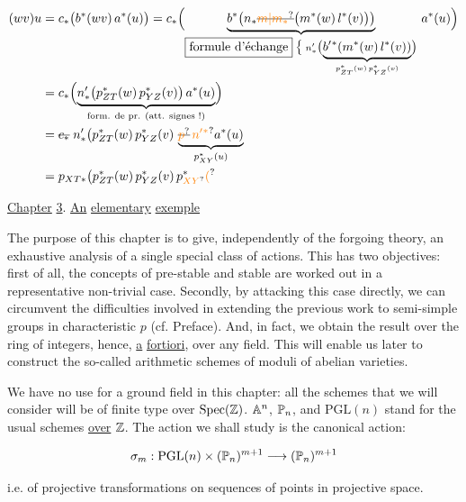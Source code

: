 \[
\begin{aligned}
(wv)u&=c_*\bigl(b^*(wv)\,a^*(u)\bigr)=c_*\Bigl(\underbrace{b^*\bigl(n_*\deleted{\unsure{m|m_*}}\bigl(m^*(w)\,l^*(v)\bigr)\bigr)}_{\substack{\boxed{\text{formule d'échange}}\;\bigl\{\;n'_*\bigl(\underbrace{b'{}^*(m^*(w)\,l^*(v))}_{p_{ZT}^*(w)\,p_{YZ}^*(v)}\bigr)}}\,a^*(u)\Bigr)\\
&=c_*\Bigl(\underbrace{n'_*\bigl(p_{ZT}^*(w)\,p_{YZ}^*(v)\bigr)\,a^*(u)}_{\text{form. de pr. (att. signes !)}}\Bigr)\\
&=\deleted{c_*}\;n'_*\bigl(p_{ZT}^*(w)\,p_{YZ}^*(v)\,\underbrace{\deleted{\unsure{p}}\,\unsure{n'{}^*}a^*(u)}_{p_{XY}^*(u)}\\
&=p_{XT*}\bigl(p_{ZT}^*(w)\,p_{YZ}^*(v)\,p_{\unsure{XY}}^{*}\unsure{(}
\end{aligned}
\]


\uline{Chapter} \uline{3}. \uline{An} \uline{elementary} \uline{exemple}

The purpose of this chapter is to give, independently of the forgoing theory, an exhaustive analysis of a single special class of actions. This has two objectives: first of all, the concepts of pre-stable and stable are worked out in a representative non-trivial case. Secondly, by attacking this case directly, we can circumvent the difficulties involved in extending the previous work to semi-simple groups in characteristic $p$ (cf. Preface). And, in fact, we obtain the result over the ring of integers, hence, \uline{a} \uline{fortiori}, over any field. This will enable us later to construct the so-called arithmetic schemes of moduli of abelian varieties.

We have no use for a ground field in this chapter: all the schemes that we will consider will be of finite type over $\operatorname{Spec}(\mathbb Z)$. $\mathbb A^{n}$, $\mathbb P_n$, and $\mathrm{PGL}(n)$ stand for the usual schemes \uline{over} \uline{$\mathbb Z$}. The action we shall study is the canonical action:

\[
\sigma_m:\mathrm{PGL}(n)\times(\mathbb P_n)^{m+1}\longrightarrow(\mathbb P_n)^{m+1}
\]

\margin{\handwritten{\unsure{--}}}

i.e. of projective transformations on sequences of points in projective space.

